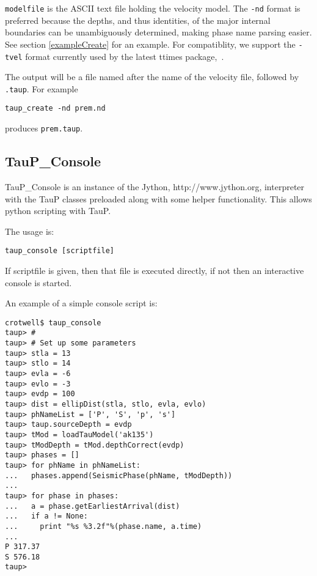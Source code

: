 \texttt{modelfile} is the ASCII text file holding the velocity model.
The \texttt{-nd} format is preferred 
because the depths, and thus identities, of the major internal boundaries can 
be unambiguously determined, making phase name parsing easier. 
See section \ref{exampleCreate} for an example.
For compatiblity, we support the \texttt{-tvel} format 
currently used by the latest ttimes package,~. 

The output will be a file named after the name of the 
velocity file, followed by \texttt{.taup}. For example

\texttt{taup\_create -nd prem.nd}

produces \texttt{prem.taup}.

\subsection{TauP\_Console}
TauP\_Console is an instance of the Jython, http://www.jython.org, interpreter with the TauP classes
preloaded along with some helper functionality. This allows python scripting with TauP.

The usage is:
\begin{verbatim}
taup_console [scriptfile]
\end{verbatim} 

If scriptfile is given, then that file is executed directly, if not then an interactive console is started.

An example of a simple console script is:
\begin{verbatim}
crotwell$ taup_console
taup> #
taup> # Set up some parameters
taup> stla = 13
taup> stlo = 14
taup> evla = -6
taup> evlo = -3
taup> evdp = 100
taup> dist = ellipDist(stla, stlo, evla, evlo)
taup> phNameList = ['P', 'S', 'p', 's']
taup> taup.sourceDepth = evdp
taup> tMod = loadTauModel('ak135')
taup> tModDepth = tMod.depthCorrect(evdp)
taup> phases = []
taup> for phName in phNameList:
...   phases.append(SeismicPhase(phName, tModDepth))
... 
taup> for phase in phases:
...   a = phase.getEarliestArrival(dist)
...   if a != None:
...     print "%s %3.2f"%(phase.name, a.time)
... 
P 317.37
S 576.18
taup> 
\end{verbatim}


